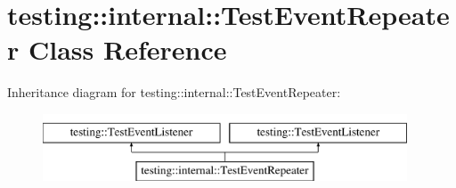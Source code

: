 \hypertarget{classtesting_1_1internal_1_1_test_event_repeater}{\section{testing\-:\-:internal\-:\-:Test\-Event\-Repeater Class Reference}
\label{classtesting_1_1internal_1_1_test_event_repeater}
}
Inheritance diagram for testing\-:\-:internal\-:\-:Test\-Event\-Repeater\-:\begin{figure}[H]
\begin{center}
\leavevmode
\includegraphics[height=2.000000cm]{classtesting_1_1internal_1_1_test_event_repeater}
\end{center}
\end{figure}
